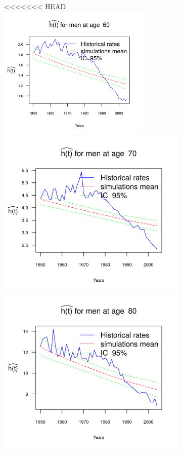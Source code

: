 \documentclass[smallextended]{svjour3}
\begin{document}
\begin{figure}[H]
\begin{figure}[H]
<<<<<<< HEAD
    \includegraphics[width = 2.85in]{PlotMen60.png}
    \includegraphics{PlotMen70.png}
    \includegraphics{PlotMen80.png}

\end{figure}
\end{figure}
\end{document}
